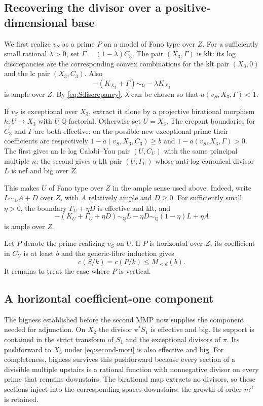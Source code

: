 \documentclass[11pt]{article}
\numberwithin{equation}{section}
\theoremstyle{definition}
\newcommand{\Q}{\mathbb Q}
\newcommand{\simq}{\sim_{\Q}}
\newcommand{\cdeg}[2]{c(#1/#2)}
\begin{document}
\subsection{Recovering the divisor over a positive-dimensional base}

We first realize $v_S$ as a prime $P$ on a model of Fano type over
$Z$. For a sufficiently small rational $\lambda>0$, set
$\Gamma=(1-\lambda)C_3$. The pair $(X_3,\Gamma)$ is klt: its log
discrepancies are the corresponding convex combinations for the
klt pair $(X_3,0)$ and the lc pair $(X_3,C_3)$. Also
\[
 -(K_{X_3}+\Gamma)\simq-\lambda K_{X_3}
\]
is ample over $Z$. By \eqref{eq:Sdiscrepancy}, $\lambda$ can be chosen
so that $a(v_S,X_3,\Gamma)<1$.

If $v_S$ is exceptional over $X_3$, extract it alone by a projective
birational morphism $h:U\to X_3$ with $U$ $\Q$-factorial. Otherwise
set $U=X_3$. The crepant boundaries for $C_3$ and $\Gamma$ are both
effective: on the possible new exceptional prime their coefficients
are respectively $1-a(v_S,X_3,C_3)\geq b$ and
$1-a(v_S,X_3,\Gamma)>0$. The first gives an lc log Calabi--Yau pair
$(U,C_U)$ with the same principal multiple $n$; the second gives a
klt pair $(U,\Gamma_U)$ whose anti-log canonical divisor $L$ is nef
and big over $Z$.

This makes $U$ of Fano type over $Z$ in the ample sense used above.
Indeed, write $L\simq A+D$ over $Z$, with $A$ relatively ample and
$D\geq0$. For sufficiently small $\eta>0$, the boundary
$\Gamma_U+\eta D$ is effective and klt, and
\[
 -(K_U+\Gamma_U+\eta D)
 \simq L-\eta D\simq(1-\eta)L+\eta A
\]
is ample over $Z$.

Let $P$ denote the prime realizing $v_S$ on $U$. If $P$ is
horizontal over $Z$, its coefficient in $C_U$ is at least $b$ and
the generic-fibre induction gives
\begin{equation}\label{eq:second-horizontal}
 \cdeg{S}{k}=\cdeg{P}{k}\leq M_{<d}(b).
\end{equation}
It remains to treat the case where $P$ is vertical.

\subsection{A horizontal coefficient-one component}

The bigness established before the second MMP now supplies the
component needed for adjunction. On $X_2$ the divisor
$\pi^*S_1$ is effective and big. Its support is contained in the
strict transform of $S_1$ and the exceptional divisors of $\pi$.
Its pushforward to $X_3$ under \eqref{eq:second-mori} is also
effective and big. For completeness, bigness survives this
pushforward because every section of a divisible multiple upstairs
is a rational function with nonnegative divisor on every prime
that remains downstairs. The birational map extracts no divisors,
so these sections inject into the corresponding spaces downstairs;
the growth of order $m^d$ is retained.
\end{document}

